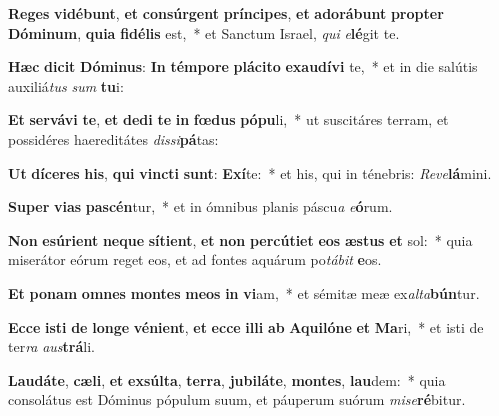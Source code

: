 \item \textbf{Re}\textbf{ges} \textbf{vi}\textbf{dé}\textbf{bunt}, \textbf{et} \textbf{con}\textbf{súr}\textbf{gent} \textbf{prín}\textbf{ci}\textbf{pes}, \textbf{et} \textbf{ad}\textbf{o}\textbf{rá}\textbf{bunt} \textbf{prop}\textbf{ter} \textbf{Dó}\textbf{mi}\textbf{num}, \textbf{qui}\textbf{a} \textbf{fi}\textbf{dé}\textbf{lis} est,~* et Sanctum Israel, \textit{qui} \textit{e}\textbf{lé}git te.
\item \textbf{Hæc} \textbf{di}\textbf{cit} \textbf{Dó}\textbf{mi}\textbf{nus}: \textbf{In} \textbf{tém}\textbf{po}\textbf{re} \textbf{plá}\textbf{ci}\textbf{to} \textbf{ex}\textbf{au}\textbf{dí}\textbf{vi} te,~* et in die salútis auxiliá\textit{tus} \textit{sum} \textbf{tu}i:
\item \textbf{Et} \textbf{ser}\textbf{vá}\textbf{vi} \textbf{te}, \textbf{et} \textbf{de}\textbf{di} \textbf{te} \textbf{in} \textbf{fœ}\textbf{dus} \textbf{pó}\textbf{pu}li,~* ut suscitáres terram, et possidéres haereditátes \textit{dis}\textit{si}\textbf{pá}tas:
\item \textbf{Ut} \textbf{dí}\textbf{ce}\textbf{res} \textbf{his}, \textbf{qui} \textbf{vinc}\textbf{ti} \textbf{sunt}: \textbf{Ex}\textbf{í}te:~* et his, qui in ténebris: \textit{Re}\textit{ve}\textbf{lá}mini.
\item \textbf{Su}\textbf{per} \textbf{vi}\textbf{as} \textbf{pa}\textbf{scén}tur,~* et in ómnibus planis páscu\textit{a} \textit{e}\textbf{ó}rum.
\item \textbf{Non} \textbf{e}\textbf{sú}\textbf{ri}\textbf{ent} \textbf{ne}\textbf{que} \textbf{sí}\textbf{ti}\textbf{ent}, \textbf{et} \textbf{non} \textbf{per}\textbf{cú}\textbf{ti}\textbf{et} \textbf{e}\textbf{os} \textbf{æs}\textbf{tus} \textbf{et} sol:~* quia miserátor eórum reget eos, et ad fontes aquárum po\textit{tá}\textit{bit} \textbf{e}os.
\item \textbf{Et} \textbf{po}\textbf{nam} \textbf{om}\textbf{nes} \textbf{mon}\textbf{tes} \textbf{me}\textbf{os} \textbf{in} \textbf{vi}am,~* et sémitæ meæ ex\textit{al}\textit{ta}\textbf{bún}tur.
\item \textbf{Ec}\textbf{ce} \textbf{is}\textbf{ti} \textbf{de} \textbf{lon}\textbf{ge} \textbf{vé}\textbf{ni}\textbf{ent}, \textbf{et} \textbf{ec}\textbf{ce} \textbf{il}\textbf{li} \textbf{ab} \textbf{A}\textbf{qui}\textbf{ló}\textbf{ne} \textbf{et} \textbf{Ma}ri,~* et isti de ter\textit{ra} \textit{aus}\textbf{trá}li.
\item \textbf{Lau}\textbf{dá}\textbf{te}, \textbf{cæ}\textbf{li}, \textbf{et} \textbf{ex}\textbf{súl}\textbf{ta}, \textbf{ter}\textbf{ra}, \textbf{ju}\textbf{bi}\textbf{lá}\textbf{te}, \textbf{mon}\textbf{tes}, \textbf{lau}dem:~* quia consolátus est Dóminus pópulum suum, et páuperum suórum \textit{mi}\textit{se}\textbf{ré}bitur.
